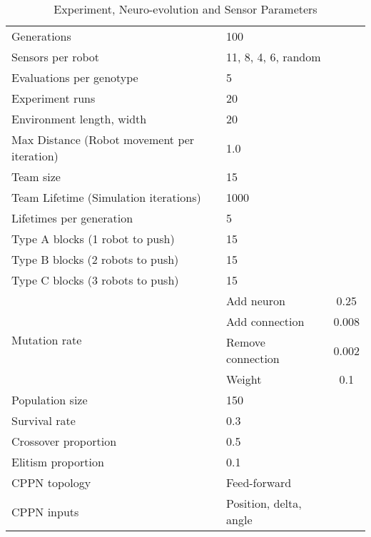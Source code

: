 \begin{table}
	\renewcommand{\arraystretch}{1.30}
	\caption{Experiment, Neuro-evolution and Sensor Parameters}\label{tab:simParameters}
	\centering
	\begin{tabular}{llc}
		\hline
		Generations	                                           & 100	\\
		Sensors per robot                                      & 11, 8, 4, 6, random \\	
		Evaluations per genotype                               & 5  \\
		Experiment runs                                        & 20 \\
		Environment length, width                              & 20 \\
        Max Distance (Robot movement per iteration)            & 1.0 \\
        Team size                                              & 15 \\
        Team Lifetime (Simulation iterations)                  & 1000 \\	
        Lifetimes per generation                               & 5 \\
        Type A blocks (1 robot to push)                        & 15 \\
        Type B blocks (2 robots to push)                       & 15 \\
        Type C blocks (3 robots to push)                       & 15 \\
		\hline
		\multirow{4}{*}{Mutation rate} & Add neuron            & 0.25 \\
		& Add connection                                       & 0.008  \\
		& Remove connection                                    & 0.002 \\
		& Weight                                               & 0.1  \\
		Population size                                        & 150 \\
		Survival rate                                          & 0.3 \\
		Crossover proportion                                   & 0.5 \\
		Elitism proportion                                     & 0.1 \\
		CPPN topology                                          & Feed-forward           \\
		CPPN inputs                                            & Position, delta, angle \\

\end{tabular}
\end{table}
